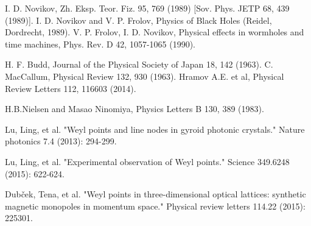 \documentclass[prb,twocolumn,aps,superscriptaddress,showpacs,floatfix]{revtex4}
\begin{document}
\begin{thebibliography}{10}
  I. D. Novikov, Zh. Eksp. Teor. Fiz. 95, 769 (1989) [Sov. Phys. JETP 68, 439 (1989)].
 I. D. Novikov and V. P. Frolov, Physics of Black Holes (Reidel, Dordrecht, 1989).
 V. P. Frolov,  I. D. Novikov, Physical effects in wormholes and time machines, Phys. Rev. D 42, 1057-1065 (1990).


 H. F. Budd, Journal of the Physical Society of Japan 18,
142 (1963).
 C. MacCallum, Physical Review 132, 930 (1963).
 Hramov A.E. et al, Physical Review Letters 112, 116603 (2014).


 H.B.Nielsen and Masao Ninomiya, Physics Letters B 130, 389 (1983).


 Lu, Ling, et al. "Weyl points and line nodes in gyroid photonic crystals." Nature photonics 7.4 (2013): 294-299. 


 Lu, Ling, et al. "Experimental observation of Weyl points." Science 349.6248 (2015): 622-624.

 Dub\v{c}ek, Tena, et al. "Weyl points in three-dimensional optical lattices: synthetic magnetic monopoles in momentum space." Physical review letters 114.22 (2015): 225301.

\end{thebibliography}
\end{document}
